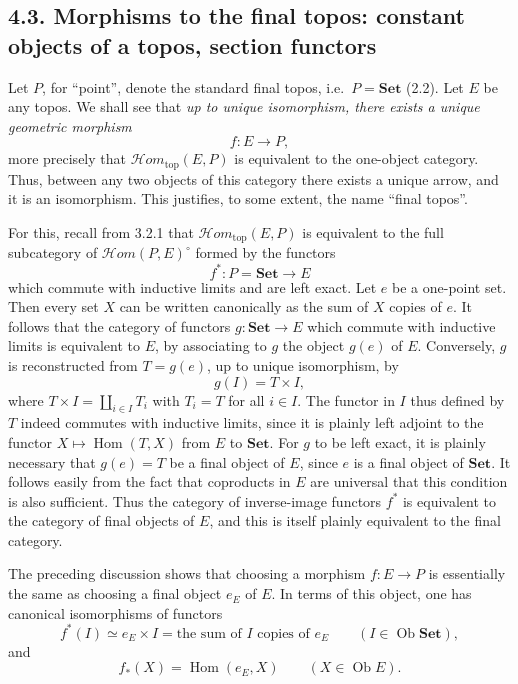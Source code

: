 \documentclass[11pt]{article}
\newcommand{\Set}{\mathbf{Set}}
\newcommand{\Hom}{\operatorname{Hom}}
\newcommand{\Ob}{\operatorname{Ob}}
\newcommand{\Hhom}{\mathcal{H}om}
\newcommand{\Hhomtop}{\mathcal{H}om_{\mathrm{top}}}
\newcommand{\ie}{i.e.}
\begin{document}
\subsection*{4.3. Morphisms to the final topos: constant objects of a topos, section functors}
Let \(P\), for ``point'', denote the standard final topos, \ie\ \(P=\Set\) (2.2). Let \(E\) be any topos. We shall see that \emph{up to unique isomorphism, there exists a unique geometric morphism}
\[
f:E\longrightarrow P,
\]
more precisely that \(\Hhomtop(E,P)\) is equivalent to the one-object category. Thus, between any two objects of this category there exists a unique arrow, and it is an isomorphism. This justifies, to some extent, the name ``final topos''.

For this, recall from 3.2.1 that \(\Hhomtop(E,P)\) is equivalent to the full subcategory of \(\Hhom(P,E)^\circ\) formed by the functors
\[
f^\ast:P=\Set\longrightarrow E
\]
which commute with inductive limits and are left exact. Let \(e\) be a one-point set. Then every set \(X\) can be written canonically as the sum of \(X\) copies of \(e\). It follows that the category of functors \(g:\Set\to E\) which commute with inductive limits is equivalent to \(E\), by associating to \(g\) the object \(g(e)\) of \(E\). Conversely, \(g\) is reconstructed from \(T=g(e)\), up to unique isomorphism, by
\[
g(I)=T\times I,
\]
where \(T\times I=\coprod_{i\in I}T_i\) with \(T_i=T\) for all \(i\in I\). The functor in \(I\) thus defined by \(T\) indeed commutes with inductive limits, since it is plainly left adjoint to the functor \(X\mapsto\Hom(T,X)\) from \(E\) to \(\Set\). For \(g\) to be left exact, it is plainly necessary that \(g(e)=T\) be a final object of \(E\), since \(e\) is a final object of \(\Set\). It follows easily from the fact that coproducts in \(E\) are universal that this condition is also sufficient. Thus the category of inverse-image functors \(f^\ast\) is equivalent to the category of final objects of \(E\), and this is itself plainly equivalent to the final category.

The preceding discussion shows that choosing a morphism \(f:E\to P\) is essentially the same as choosing a final object \(e_E\) of \(E\). In terms of this object, one has canonical isomorphisms of functors
\[
f^\ast(I)\simeq e_E\times I
=\text{the sum of }I\text{ copies of }e_E
\qquad(I\in\Ob\Set),\tag{4.3.2}
\]
and
\[
f_\ast(X)=\Hom(e_E,X)
\qquad(X\in\Ob E).\tag{4.3.3}
\]
\end{document}
